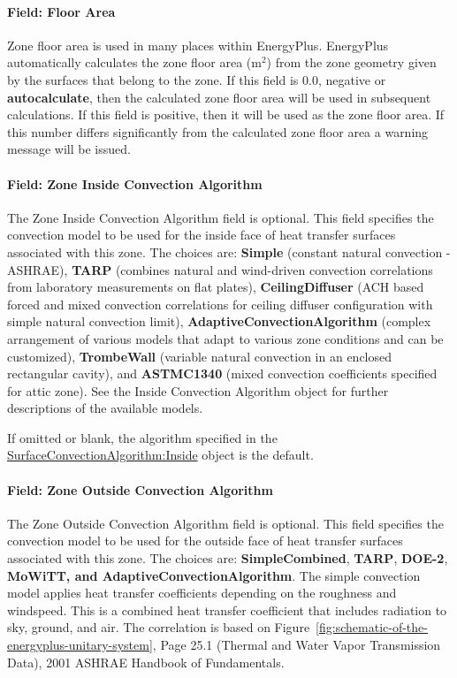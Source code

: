 \paragraph{Field: Floor Area}\label{field-floor-area}

Zone floor area is used in many places within EnergyPlus. EnergyPlus automatically calculates the zone floor area (m\(^{2}\)) from the zone geometry given by the surfaces that belong to the zone. If this field is 0.0, negative or \textbf{autocalculate}, then the calculated zone floor area will be used in subsequent calculations. If this field is positive, then it will be used as the zone floor area. If this number differs significantly from the calculated zone floor area a warning message will be issued.

\paragraph{Field: Zone Inside Convection Algorithm}\label{field-zone-inside-convection-algorithm}

The Zone Inside Convection Algorithm field is optional. This field specifies the convection model to be used for the inside face of heat transfer surfaces associated with this zone. The choices are: \textbf{Simple} (constant natural convection - ASHRAE), \textbf{TARP} (combines natural and wind-driven convection correlations from laboratory measurements on flat plates), \textbf{CeilingDiffuser} (ACH based forced and mixed convection correlations for ceiling diffuser configuration with simple natural convection limit), \textbf{AdaptiveConvectionAlgorithm} (complex arrangement of various models that adapt to various zone conditions and can be customized), \textbf{TrombeWall} (variable natural convection in an enclosed rectangular cavity), and \textbf{ASTMC1340} (mixed convection coefficients specified for attic zone). See the Inside Convection Algorithm object for further descriptions of the available models.

If omitted or blank, the algorithm specified in the \hyperref[surfaceconvectionalgorithminside]{SurfaceConvectionAlgorithm:Inside} object is the default.

\paragraph{Field: Zone Outside Convection Algorithm}\label{field-zone-outside-convection-algorithm}

The Zone Outside Convection Algorithm field is optional. This field specifies the convection model to be used for the outside face of heat transfer surfaces associated with this zone. The choices are: \textbf{SimpleCombined}, \textbf{TARP}, \textbf{DOE-2}, \textbf{MoWiTT, and AdaptiveConvectionAlgorithm}. The simple convection model applies heat transfer coefficients depending on the roughness and windspeed. This is a combined heat transfer coefficient that includes radiation to sky, ground, and air. The correlation is based on Figure~\ref{fig:schematic-of-the-energyplus-unitary-system}, Page 25.1 (Thermal and Water Vapor Transmission Data), 2001 ASHRAE Handbook of Fundamentals.

